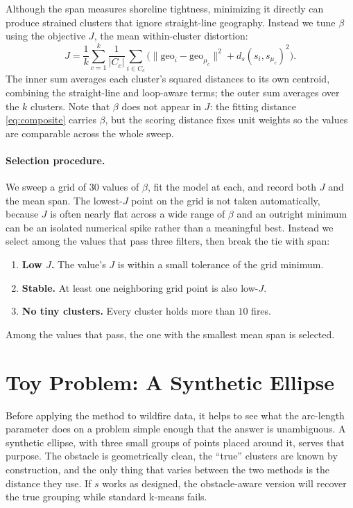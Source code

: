 \documentclass[11pt]{article}
\begin{document}
Although the span measures shoreline tightness, minimizing it directly can produce strained clusters that ignore straight-line geography. Instead we tune $\beta$ using the objective $J$, the mean within-cluster distortion:
\begin{equation}
J = \frac{1}{k} \sum_{c=1}^{k} \frac{1}{|C_c|} \sum_{i \in C_c}
\Big( \big\lVert \text{geo}_i - \text{geo}_{\mu_c} \big\rVert^2 + d_s(s_i, s_{\mu_c})^2 \Big).
\label{eq:objective}
\end{equation}
The inner sum averages each cluster's squared distances to its own centroid, combining the straight-line and loop-aware terms; the outer sum averages over the $k$ clusters. Note that $\beta$ does not appear in $J$: the fitting distance \eqref{eq:composite} carries $\beta$, but the scoring distance fixes unit weights so the values are comparable across the whole sweep.
 
\paragraph{Selection procedure.}
We sweep a grid of $30$ values of $\beta$, fit the model at each, and record both $J$ and the mean span. The lowest-$J$ point on the grid is not taken automatically, because $J$ is often nearly flat across a wide range of $\beta$ and an outright minimum can be an isolated numerical spike rather than a meaningful best. Instead we select among the values that pass three filters, then break the tie with span:
\begin{enumerate}[nosep, leftmargin=1.4em]
\item \textbf{Low $J$.} The value's $J$ is within a small tolerance of the grid minimum.
\item \textbf{Stable.} At least one neighboring grid point is also low-$J$.
\item \textbf{No tiny clusters.} Every cluster holds more than $10$ fires.
\end{enumerate}
Among the values that pass, the one with the smallest mean span is selected.

\section{Toy Problem: A Synthetic Ellipse}
\label{sec:toy}
 
Before applying the method to wildfire data, it helps to see what the arc-length parameter does on a problem simple enough that the answer is unambiguous. A synthetic ellipse, with three small groups of points placed around it, serves that purpose. The obstacle is geometrically clean, the ``true'' clusters are known by construction, and the only thing that varies between the two methods is the distance they use. If $s$ works as designed, the obstacle-aware version will recover the true grouping while standard k-means fails.
 
\end{document}
